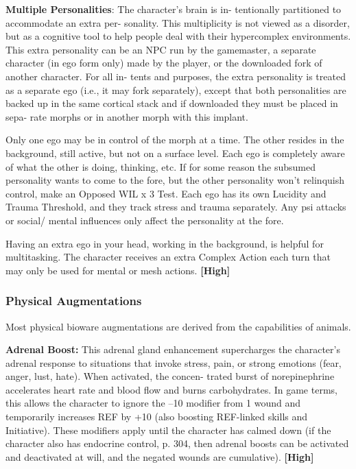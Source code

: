 \textbf{Multiple Personalities}: The character's brain is in-
tentionally partitioned to accommodate an extra per-
sonality. This multiplicity is not viewed as a disorder, 
but as a cognitive tool to help people deal with their 
hypercomplex environments. This extra personality 
can be an NPC run by the gamemaster, a separate 
character (in ego form only) made by the player, or 
the downloaded fork of another character. For all in-
tents and purposes, the extra personality is treated as 
a separate ego (i.e., it may fork separately), except that 
both personalities are backed up in the same cortical 
stack and if downloaded they must be placed in sepa-
rate morphs or in another morph with this implant.

Only one ego may be in control of the morph at a 
time. The other resides in the background, still active, 
but not on a surface level. Each ego is completely 
aware of what the other is doing, thinking, etc. If for 
some reason the subsumed personality wants to come 
to the fore, but the other personality won't relinquish 
control, make an Opposed WIL x 3 Test. Each ego has 
its own Lucidity and Trauma Threshold, and they track 
stress and trauma separately. Any psi attacks or social/
mental influences only affect the personality at the fore.

Having an extra ego in your head, working in the 
background, is helpful for multitasking. The character 
receives an extra Complex Action each turn that may 
only be used for mental or mesh actions. \textbf{[High]}

\subsubsection{Physical Augmentations}

Most physical bioware augmentations are derived 
from the capabilities of animals.

\textbf{Adrenal Boost:} This adrenal gland enhancement 
supercharges the character's adrenal response to 
situations that invoke stress, pain, or strong emotions 
(fear, anger, lust, hate). When activated, the concen-
trated burst of norepinephrine accelerates heart rate 
and blood flow and burns carbohydrates. In game 
terms, this allows the character to ignore the –10 
modifier from 1 wound and temporarily increases 
REF by +10 (also boosting REF-linked skills and 
Initiative). These modifiers apply until the character 
has calmed down (if the character also has endocrine 
control, p. 304, then adrenal boosts can be activated 
and deactivated at will, and the negated wounds are 
cumulative). \textbf{[High]}

